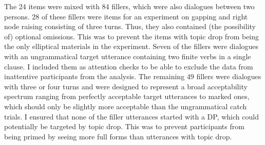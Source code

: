 The 24 items were mixed with 84 fillers, which were also dialogues between two persons.
28 of these fillers were items for an experiment on gapping and right node raising consisting of three turns.
Thus, they also contained (the possibility of) optional omissions.
This was to prevent the items with topic drop from being the only elliptical materials in the experiment.
Seven of the fillers were dialogues with an ungrammatical target utterance containing two finite verbs in a single clause.
I included them as attention checks to be able to exclude the data from inattentive participants from the analysis.
The remaining 49 fillers were dialogues with three or four turns and were designed to represent a broad acceptability spectrum ranging from perfectly acceptable target utterances to marked ones, which should only be slightly more acceptable than the ungrammatical catch trials.
I ensured that none of the filler utterances started with a DP, which could potentially be targeted by topic drop.
This was to prevent participants from being primed by seeing more full forms than utterances with topic drop.


